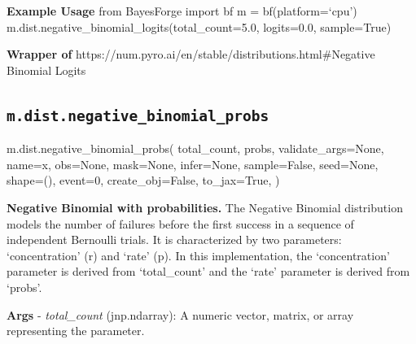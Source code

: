 \documentclass[
  letterpaper,
  DIV=11,
  numbers=noendperiod]{scrartcl}
\newenvironment{Shaded}{\begin{snugshade}}{\end{snugshade}}
\newcommand{\DecValTok}[1]{\textcolor[rgb]{0.68,0.00,0.00}{#1}}
\newcommand{\NormalTok}[1]{\textcolor[rgb]{0.00,0.23,0.31}{#1}}
\newcommand{\OperatorTok}[1]{\textcolor[rgb]{0.37,0.37,0.37}{#1}}
\newcommand{\StringTok}[1]{\textcolor[rgb]{0.13,0.47,0.30}{#1}}
\newcommand{\VariableTok}[1]{\textcolor[rgb]{0.07,0.07,0.07}{#1}}
\begin{document}
\textbf{Example Usage} from BayesForge import bf m = bf(platform=`cpu')
m.dist.negative\_binomial\_logits(total\_count=5.0, logits=0.0,
sample=True)

\textbf{Wrapper of}
https://num.pyro.ai/en/stable/distributions.html\#Negative Binomial
Logits

\subsection{\texorpdfstring{\texttt{m.dist.negative\_binomial\_probs}}{m.dist.negative\_binomial\_probs}}\label{negative_binomial_probs}

\begin{Shaded}
\begin{Highlighting}[]
\NormalTok{m.dist.negative\_binomial\_probs(}
\NormalTok{    total\_count,}
\NormalTok{    probs,}
\NormalTok{    validate\_args}\OperatorTok{=}\VariableTok{None}\NormalTok{,}
\NormalTok{    name}\OperatorTok{=}\StringTok{\textquotesingle{}x\textquotesingle{}}\NormalTok{,}
\NormalTok{    obs}\OperatorTok{=}\VariableTok{None}\NormalTok{,}
\NormalTok{    mask}\OperatorTok{=}\VariableTok{None}\NormalTok{,}
\NormalTok{    infer}\OperatorTok{=}\VariableTok{None}\NormalTok{,}
\NormalTok{    sample}\OperatorTok{=}\VariableTok{False}\NormalTok{,}
\NormalTok{    seed}\OperatorTok{=}\VariableTok{None}\NormalTok{,}
\NormalTok{    shape}\OperatorTok{=}\NormalTok{(),}
\NormalTok{    event}\OperatorTok{=}\DecValTok{0}\NormalTok{,}
\NormalTok{    create\_obj}\OperatorTok{=}\VariableTok{False}\NormalTok{,}
\NormalTok{    to\_jax}\OperatorTok{=}\VariableTok{True}\NormalTok{,}
\NormalTok{)}
\end{Highlighting}
\end{Shaded}

\textbf{Negative Binomial with probabilities.} The Negative Binomial
distribution models the number of failures before the first success in a
sequence of independent Bernoulli trials. It is characterized by two
parameters: `concentration' (r) and `rate' (p). In this implementation,
the `concentration' parameter is derived from `total\_count' and the
`rate' parameter is derived from `probs'.

\textbf{Args} - \emph{total\_count} (jnp.ndarray): A numeric vector,
matrix, or array representing the parameter.
\end{document}
